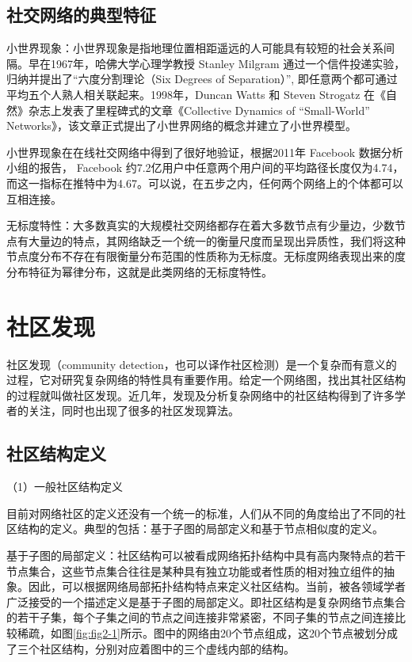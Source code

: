 \subsection{社交网络的典型特征}

小世界现象：小世界现象是指地理位置相距遥远的人可能具有较短的社会关系间隔。早在1967年，哈佛大学心理学教授 Stanley Milgram 通过一个信件投递实验，归纳并提出了“六度分割理论（Six Degrees of Separation）”,  即任意两个都可通过平均五个人熟人相关联起来。1998年，Duncan Watts 和 Steven Strogatz 在《自然》杂志上发表了里程碑式的文章《Collective Dynamics of “Small-World” Networks》，该文章正式提出了小世界网络的概念并建立了小世界模型。

小世界现象在在线社交网络中得到了很好地验证，根据2011年 Facebook 数据分析小组的报告， Facebook 约7.2亿用户中任意两个用户间的平均路径长度仅为4.74，而这一指标在推特中为4.67。可以说，在五步之内，任何两个网络上的个体都可以互相连接。

无标度特性：大多数真实的大规模社交网络都存在着大多数节点有少量边，少数节点有大量边的特点，其网络缺乏一个统一的衡量尺度而呈现出异质性，我们将这种节点度分布不存在有限衡量分布范围的性质称为无标度。无标度网络表现出来的度分布特征为幂律分布，这就是此类网络的无标度特性。

\section{社区发现}

社区发现（community detection，也可以译作社区检测）是一个复杂而有意义的过程，它对研究复杂网络的特性具有重要作用。给定一个网络图，找出其社区结构的过程就叫做社区发现。近几年，发现及分析复杂网络中的社区结构得到了许多学者的关注，同时也出现了很多的社区发现算法。

\subsection{社区结构定义}

（1）一般社区结构定义

目前对网络社区的定义还没有一个统一的标准，人们从不同的角度给出了不同的社区结构的定义。典型的包括：基于子图的局部定义和基于节点相似度的定义。

基于子图的局部定义：社区结构可以被看成网络拓扑结构中具有高内聚特点的若干节点集合，这些节点集合往往是某种具有独立功能或者性质的相对独立组件的抽象。因此，可以根据网络局部拓扑结构特点来定义社区结构。当前，被各领域学者广泛接受的一个描述定义是基于子图的局部定义。即社区结构是复杂网络节点集合的若干子集，每个子集之间的节点之间连接非常紧密，不同子集的节点之间连接比较稀疏，如图\ref{fig:fig2-1}所示。图中的网络由20个节点组成，这20个节点被划分成了三个社区结构，分别对应着图中的三个虚线内部的结构。

